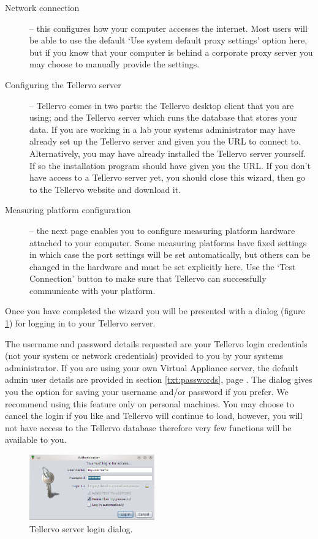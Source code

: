 \begin{description}
 \item[Network connection] -- this configures how your computer accesses the internet.  Most users will be able to use the default `Use system default proxy settings' option here, but if you know that your computer is behind a corporate proxy server you may choose to manually provide the settings.
 \item[Configuring the Tellervo server] -- Tellervo comes in two parts: the Tellervo desktop client that you are using; and the Tellervo server which runs the database that stores your data.  If you are working in a lab your systems administrator may have already set up the Tellervo server and given you the URL to connect to.  Alternatively, you may have already installed the Tellervo server yourself.  If so the installation program should have given you the URL. If you don't have access to a Tellervo server yet, you should close this wizard, then go to the Tellervo website and download it.
 \item[Measuring platform configuration] -- the next page enables you to configure measuring platform hardware attached to your computer.  Some measuring platforms have fixed settings in which case the port settings will be set automatically, but others can be changed in the hardware and must be set explicitly here. Use the `Test Connection' button to make sure that Tellervo can successfully communicate with your platform.
\end{description}


Once you have completed the wizard you will be presented with a dialog (figure \ref{fig:login}) for logging in to your Tellervo server.

The username and password details requested are your Tellervo login credentials (not your system or network credentials) provided to you by your systems administrator.  If you are using your own Virtual Appliance server, the default admin user details are provided in section \ref{txt:passwords}, page \pageref{txt:passwords}.  The dialog gives you the option for saving your username and/or password if you prefer.  We recommend using this feature only on personal machines.  You may choose to cancel the login if you like and Tellervo will continue to load, however, you will not have access to the Tellervo database therefore very few functions will be available to you.

\begin{figure}
  \begin{center}
    \includegraphics[width=0.48\textwidth]{Images/login.png}
  \end{center}
  \caption{Tellervo server login dialog.}
  \label{fig:login}
\end{figure}

